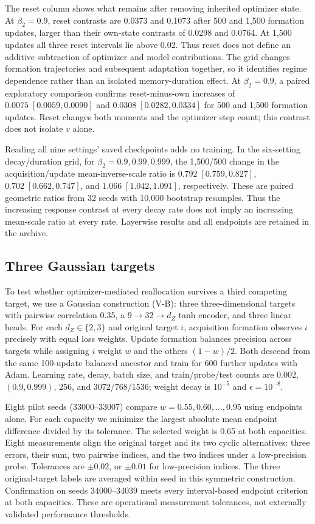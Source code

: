 The reset column shows what remains after removing inherited optimizer state. At $\beta_2=0.9$, reset contrasts are 0.0373 and 0.1073 after 500 and 1,500 formation updates, larger than their own-state contrasts of 0.0298 and 0.0764. At 1,500 updates all three reset intervals lie above 0.02. Thus reset does not define an additive subtraction of optimizer and model contributions. The grid changes formation trajectories and subsequent adaptation together, so it identifies regime dependence rather than an isolated memory-duration effect. At $\beta_2=0.9$, a paired exploratory comparison confirms reset-minus-own increases of $0.0075\;[0.0059,0.0090]$ and $0.0308\;[0.0282,0.0334]$ for 500 and 1,500 formation updates. Reset changes both moments and the optimizer step count; this contrast does not isolate $v$ alone.

Reading all nine settings' saved checkpoints adds no training. In the six-setting decay/duration grid, for $\beta_2=0.9,0.99,0.999$, the 1,500/500 change in the acquisition/update mean-inverse-scale ratio is $0.792\;[0.759,0.827]$, $0.702\;[0.662,0.747]$, and $1.066\;[1.042,1.091]$, respectively. These are paired geometric ratios from 32 seeds with 10,000 bootstrap resamples. Thus the increasing response contrast at every decay rate does not imply an increasing mean-scale ratio at every rate. Layerwise results and all endpoints are retained in the archive.

\subsection{Three Gaussian targets}
\label{app:threeadapt}
To test whether optimizer-mediated reallocation survives a third competing target, we use a Gaussian construction (V-B): three three-dimensional targets with pairwise correlation 0.35, a $9\to32\to d_Z$ tanh encoder, and three linear heads. For each $d_Z\in\{2,3\}$ and original target $i$, acquisition formation observes $i$ precisely with equal loss weights. Update formation balances precision across targets while assigning $i$ weight $w$ and the others $(1-w)/2$. Both descend from the same 100-update balanced ancestor and train for 600 further updates with Adam. Learning rate, decay, batch size, and train/probe/test counts are $0.002$, $(0.9,0.999)$, 256, and $3072/768/1536$; weight decay is $10^{-5}$ and $\epsilon=10^{-8}$.

Eight pilot seeds (33000--33007) compare $w=0.55,0.60,\ldots,0.95$ using endpoints alone. For each capacity we minimize the largest absolute mean endpoint difference divided by its tolerance. The selected weight is 0.65 at both capacities. Eight measurements align the original target and its two cyclic alternatives: three errors, their sum, two pairwise indices, and the two indices under a low-precision probe. Tolerances are $\pm0.02$, or $\pm0.01$ for low-precision indices. The three original-target labels are averaged within seed in this symmetric construction. Confirmation on seeds 34000--34039 meets every interval-based endpoint criterion at both capacities. These are operational measurement tolerances, not externally validated performance thresholds.

